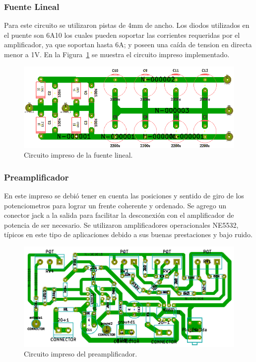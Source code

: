 \subsubsection{Fuente Lineal}
\medskip
Para este circuito se utilizaron pistas de 4mm de ancho. Los diodos utilizados en el puente son 6A10 los cuales pueden soportar las corrientes requeridas por el amplificador, ya que soportan hasta 6A; y poseen una caída de tension en directa menor a 1V.
En la Figura~\ref{circuito_impreso_fuente_lineal} se muestra el circuito impreso implementado. 



\begin{figure}[H]
\centering
\centerline{\includegraphics[width=1\textwidth]{img/circuito_impreso_fuente_lineal.png}}
\caption{Circuito impreso de la fuente lineal.}
\label{circuito_impreso_fuente_lineal} 
\end{figure}
\medskip
\subsubsection{Preamplificador}

En este impreso se debió tener en cuenta las posiciones y sentido de giro de los potenciometros para lograr un frente coherente y ordenado. Se agrego un conector jack a la salida para facilitar la desconexión con el amplificador de potencia de ser necesario.
Se utilizaron amplificadores operacionales NE5532, típicos en este tipo de aplicaciones debido a sus buenas prestaciones y bajo ruido.

\begin{figure}[H]
\centering
\centerline{\includegraphics[width=1\textwidth]{img/pre_pcb.png}}
\caption{Circuito impreso del preamplificador.}
\label{pre_pcb} 
\end{figure}